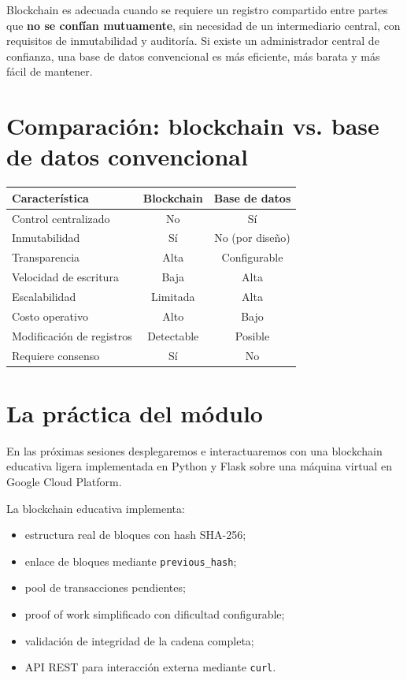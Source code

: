 \documentclass[
  coursetitle={Cómputo Nube y Tecnologías Emergentes},
  coursehours={96},
  coursedate={Verano 2026},
  doctype={Notas de clase},
  otherlangs={english,french},
  authorname={Lázaro},
  authorsurname={Bustio-Martínez},
  authortitle={PhD},
  role={Profesor Investigador},
  email={lbustio@inaoe.mx},
  phone={5559504000},
  ext={7459},
  institution={Instituto Nacional de Astrofísica, Óptica y Electrónica (INAOE)},
  department={Maestría en Ciencias en Tecnologías de Seguridad},
  address={Luis Enrique Erro 1, Sta. Ma. Tonantzintla, San Andrés Cholula, CP 72840, Puebla, México},
  margin={0.5in}
]{../../lbustio_lecture_notes}
\begin{document}
\begin{tcolorbox}[title=Cuándo blockchain tiene sentido]
Blockchain es adecuada cuando se requiere un registro compartido entre partes que \textbf{no se confían mutuamente}, sin necesidad de un intermediario central, con requisitos de inmutabilidad y auditoría. Si existe un administrador central de confianza, una base de datos convencional es más eficiente, más barata y más fácil de mantener.
\end{tcolorbox}

\section{Comparación: blockchain vs. base de datos convencional}

\begin{center}
\begin{tabular}{lcc}
\hline
\textbf{Característica} & \textbf{Blockchain} & \textbf{Base de datos} \\
\hline
Control centralizado       & No         & Sí \\
Inmutabilidad              & Sí         & No (por diseño) \\
Transparencia              & Alta       & Configurable \\
Velocidad de escritura     & Baja       & Alta \\
Escalabilidad              & Limitada   & Alta \\
Costo operativo            & Alto       & Bajo \\
Modificación de registros  & Detectable & Posible \\
Requiere consenso          & Sí         & No \\
\hline
\end{tabular}
\end{center}

\section{La práctica del módulo}

En las próximas sesiones desplegaremos e interactuaremos con una blockchain educativa ligera implementada en Python y Flask sobre una máquina virtual en Google Cloud Platform.

La blockchain educativa implementa:
\begin{itemize}
  \item estructura real de bloques con hash SHA-256;
  \item enlace de bloques mediante \texttt{previous\_hash};
  \item pool de transacciones pendientes;
  \item proof of work simplificado con dificultad configurable;
  \item validación de integridad de la cadena completa;
  \item API REST para interacción externa mediante \texttt{curl}.
\end{itemize}
\end{document}
